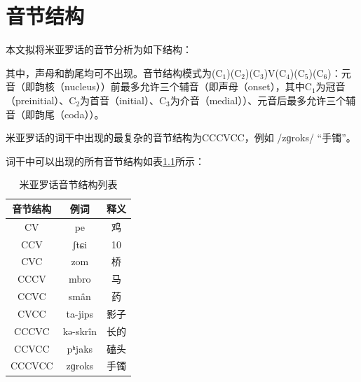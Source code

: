 \chapter{音节结构}

本文拟将米亚罗话的音节分析为如下结构：

\begin{center}
\end{center}

\noindent
其中，声母和韵尾均可不出现。音节结构模式为(C$_{1}$)(C$_{2}$)(C$_{3}$)V(C$_{4}$)(C$_{5}$)(C$_{6}$)：元音（即韵核（nucleus））前最多允许三个辅音（即声母（onset），其中C$_{1}$为冠音（preinitial）、C$_{2}$为首音（initial）、C$_{3}$为介音（medial））、元音后最多允许三个辅音（即韵尾（coda））。

米亚罗话的词干中出现的最复杂的音节结构为CCCVCC，例如 /zɡroks/ “手镯”。

\begin{center}
\end{center}
\noindent
词干中可以出现的所有音节结构如表\ref{systr}所示：

\begin{table}[H]
\vspace{5pt}
    \centering
    \caption{米亚罗话音节结构列表}
    \label{systr}
\begin{tabular}{ccc}
\toprule
音节结构   & 例词        & 释义 \\
\midrule
CV     & pe        & 鸡  \\
CCV    & ʃtɕi      & 10 \\
CVC    & zom       & 桥  \\
CCCV   & mbro      & 马  \\
CCVC   & smân     & 药  \\
CVCC   & ta-jips   & 影子 \\
CCCVC  & kə-skrîn & 长的 \\
CCVCC  & pʰjaks    & 磕头 \\
CCCVCC & zɡroks    & 手镯 \\
\bottomrule
\end{tabular}
\end{table}

